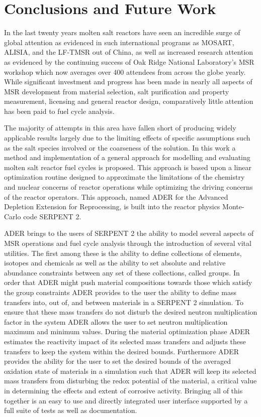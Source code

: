 \chapter{Conclusions and Future Work}
\label{ch:conc}

In the last twenty years molten salt reactors have seen an incredible surge of
global attention as evidenced in such international programs as MOSART, ALISIA,
and the LF-TMSR out of China, as well as increased research attention as
evidenced by the continuing success of Oak Ridge National Laboratory's MSR
workshop which now averages over 400 attendees from across the globe yearly. 
While significant investment and progress has been made in nearly all aspects
of MSR development from material selection, salt purification and property
measurement, licensing and general reactor design, comparatively little
attention has been paid to fuel cycle analysis. 

The majority of attempts in
this area have fallen short of producing widely applicable results largely due
to the limiting effects of specific assumptions such as the salt species
involved or the coarseness of the solution. In this work a method and
implementation of a general approach for modelling and evaluating molten salt
reactor fuel cycles is proposed. This approach is based upon a linear
optimization routine designed to approximate the limitations of the chemistry
and nuclear concerns of reactor operations while optimizing the driving concerns
of the reactor operators. This approach, named ADER for the Advanced Depletion
Extension for Reprocessing, is built into the reactor physics Monte-Carlo code
SERPENT 2.  

ADER brings to the users of SERPENT 2 the ability to model several aspects of
MSR operations and fuel cycle analysis through the introduction of several vital
utilities. The first among these is the ability to define collections of
elements, isotopes and chemicals as well as the ability to set absolute and 
relative abundance constraints between any set of these collections, called
groups. In order that ADER might push material compositions towards those which
satisfy the group constraints ADER provides to the user the ability to define
mass transfers into, out of, and between materials in a SERPENT 2 simulation. 
To ensure that these mass transfers do not disturb the desired neutron
multiplication factor in the system ADER allows the user to set neutron 
multiplication maximum and minimum values. During the material optimization
phase ADER estimates the reactivity impact of its selected mass transfers and
adjusts these transfers to keep the system within the desired bounds. Furthermore
ADER provides the ability for the user to set the desired bounds of the averaged
oxidation state of materials in a simulation such that ADER will keep its
selected mass transfers from disturbing the redox potential of the material,
a critical value in determining the effects and extent of corrosive activity. 
Bringing all of this together is an easy to use and directly integrated user
interface supported by a full suite of tests as well as documentation. 

